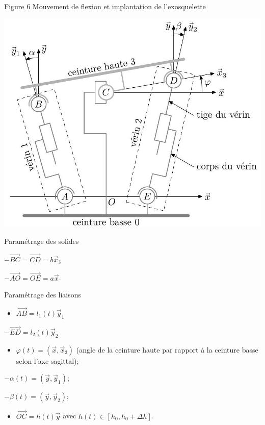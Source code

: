 \documentclass[10pt]{article}
\begin{document}
Figure 6 Mouvement de flexion et implantation de l'exosquelette

\begin{center}
\includegraphics[max width=\textwidth]{2024_03_20_0c3cf888f6e04b1986bcg-05(1)}
\end{center}

Paramétrage des solides

$-\overrightarrow{B C}=\overrightarrow{C D}=b \vec{x}_{3}$

$-\overrightarrow{A O}=\overrightarrow{O E}=a \vec{x}$.

Paramétrage des liaisons

\begin{itemize}
  \item $\overrightarrow{A B}=l_{1}(t) \vec{y}_{1}$
\end{itemize}

$-\overrightarrow{E D}=l_{2}(t) \vec{y}_{2}$

\begin{itemize}
  \item $\varphi(t)=\left(\vec{x}, \vec{x}_{3}\right)$ (angle de la ceinture haute par rapport à la ceinture basse selon l'axe sagittal);
\end{itemize}

$-\alpha(t)=\left(\vec{y}, \vec{y}_{1}\right)$;

$-\beta(t)=\left(\vec{y}, \vec{y}_{2}\right)$;

\begin{itemize}
  \item $\overrightarrow{O C}=h(t) \vec{y}$ avec $h(t) \in\left[h_{0}, h_{0}+\Delta h\right]$.
\end{itemize}
\end{document}
